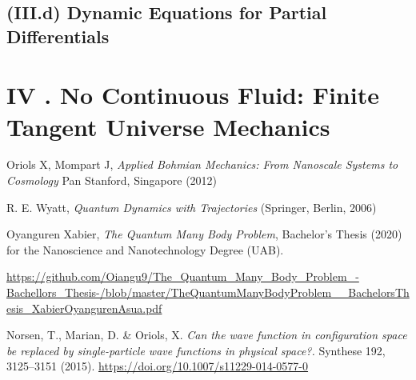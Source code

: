 \documentclass[11pt, a4paper]{article} %
\begin{document}
\subsection*{(III.d) Dynamic Equations for Partial Differentials}

\newpage
\section*{IV . No Continuous Fluid: Finite Tangent Universe Mechanics}




 


\begin{thebibliography}{1}

	Oriols X, Mompart J, {\em Applied Bohmian Mechanics: From Nanoscale Systems to Cosmology} Pan Stanford, Singapore (2012)
	

R. E. Wyatt, {\em Quantum Dynamics with Trajectories} (Springer, Berlin, 2006)


	Oyanguren Xabier, {\em The Quantum Many Body Problem}, Bachelor's Thesis (2020) for the Nanoscience and Nanotechnology Degree (UAB).

\href{https://github.com/Oiangu9/The\_Quantum\_Many\_Body\_Problem\_-Bachellors\_Thesis-/blob/master/TheQuantumManyBodyProblem\_\_BachelorsThesis\_XabierOyangurenAsua.pdf}{https://github.com/Oiangu9/The\_Quantum\_Many\_Body\_Problem\_-Bachellors\_Thesis-/blob/master/TheQuantumManyBodyProblem\_\_BachelorsThesis\_XabierOyangurenAsua.pdf}

Norsen, T., Marian, D. \& Oriols, X. {\em Can the wave function in configuration space be replaced by single-particle wave functions in physical space?.} Synthese 192, 3125–3151 (2015). \href{https://doi.org/10.1007/s11229-014-0577-0}{https://doi.org/10.1007/s11229-014-0577-0}



\end{thebibliography}
\end{document}
